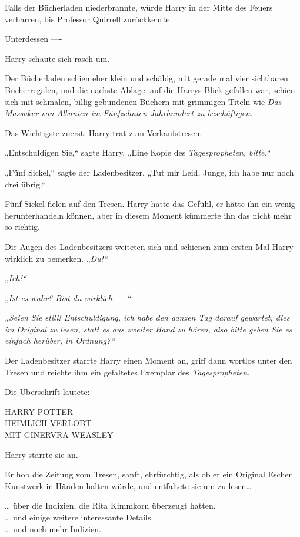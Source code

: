{Falls der Bücherladen niederbrannte, würde Harry in der Mitte des Feuers verharren, bis Professor Quirrell zurückkehrte.

Unterdessen ----

Harry schaute sich rasch um.

Der Bücherladen schien eher klein und schäbig, mit gerade mal vier sichtbaren Bücherregalen, und die nächste Ablage, auf die Harrys Blick gefallen war, schien sich mit schmalen, billig gebundenen Büchern mit grimmigen Titeln wie \emph{Das Massaker von Albanien im Fünfzehnten Jahrhundert zu beschäftigen.}

Das Wichtigste zuerst. Harry trat zum Verkaufstresen.

„Entschuldigen Sie,“ sagte Harry, „Eine Kopie des \emph{Tagespropheten, bitte.“}

„Fünf Sickel,“ sagte der Ladenbesitzer. „Tut mir Leid, Junge, ich habe nur noch drei übrig.“

Fünf Sickel fielen auf den Tresen. Harry hatte das Gefühl, er hätte ihn ein wenig herunterhandeln können, aber in diesem Moment kümmerte ihn das nicht mehr so richtig.

Die Augen des Ladenbesitzers weiteten sich und schienen zum ersten Mal Harry wirklich zu bemerken. „\emph{Du!“}

„\emph{Ich!“}

„\emph{Ist es wahr? Bist du wirklich ----“}

\emph{„\emph{Seien Sie still!} Entschuldigung, ich habe den \emph{ganzen Tag} darauf gewartet, dies im Original zu lesen, statt es aus zweiter Hand zu hören, also bitte \emph{geben Sie es einfach herüber,} in Ordnung?“}

Der Ladenbesitzer starrte Harry einen Moment an, griff dann wortlos unter den Tresen und reichte ihm ein gefaltetes Exemplar des \emph{Tagespropheten.}

Die Überschrift lautete:

HARRY POTTER\\ HEIMLICH VERLOBT\\ MIT GINERVRA WEASLEY

Harry starrte sie an.

Er hob die Zeitung vom Tresen, sanft, ehrfürchtig, als ob er ein Original Escher Kunstwerk in Händen halten würde, und entfaltete sie um zu lesen…

… über die Indizien, die Rita Kimmkorn überzeugt hatten.\\ … und einige weitere interessante Details.\\ … und noch mehr Indizien.

}
